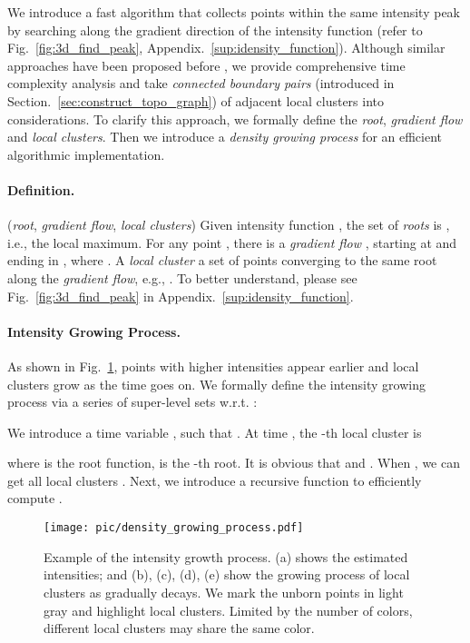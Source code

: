 \documentclass[letterpaper]{article} \usepackage{aaai22}  \usepackage{times}  \usepackage{helvet}  \usepackage{courier}  \usepackage[hyphens]{url}  \usepackage{graphicx} \urlstyle{rm} \def\UrlFont{\rm}  \usepackage{natbib}  \usepackage{caption} \DeclareCaptionStyle{ruled}{labelfont=normalfont,labelsep=colon,strut=off} \frenchspacing  \setlength{\pdfpagewidth}{8.5in}  \setlength{\pdfpageheight}{11in}  \usepackage{subfigure}
\begin{document}
We introduce a fast algorithm that collects points within the same intensity peak by searching along the gradient direction of the intensity function (refer to Fig.~\ref{fig:3d_find_peak}, Appendix.~\ref{sup:idensity_function}). Although similar approaches have been proposed before \cite{chazal2013persistence, rodriguez2014clustering}, we provide comprehensive time complexity analysis and take \textit{connected boundary pairs} (introduced in Section.~\ref{sec:construct_topo_graph}) of adjacent local clusters into considerations. To clarify this approach, we formally define the \textit{root}, \textit{gradient flow} and \textit{local clusters}. Then we introduce a \textit{density growing process} for an efficient algorithmic implementation.




\paragraph{Definition.} (\textit{root}, \textit{gradient flow}, \textit{local clusters})
 Given intensity function , the set of \textit{roots} is , i.e., the local maximum. 
 For any point , there is a \textit{gradient flow} , starting at  and ending in  , where . A \textit{local cluster} a set of points converging to the same root along the \textit{gradient flow}, e.g., . To better understand, please see Fig.~\ref{fig:3d_find_peak} in Appendix.~\ref{sup:idensity_function}.\\


\paragraph{Intensity Growing Process.} As shown in Fig.~\ref{fig:density_growing_process}, points with higher intensities appear earlier and local clusters grow as the time goes on. We formally define the intensity growing process via a series of super-level sets w.r.t. :

We introduce a time variable , such that . At time , the -th local cluster is 

where  is the root function,  is the -th root. It is obvious that  and . When , we can get all local clusters . Next, we introduce a recursive function to efficiently compute .



\begin{figure}[h]
    \centering
    \texttt{[image: pic/density\_growing\_process.pdf]}
    \caption{ Example of the intensity growth process. (a) shows the estimated intensities; and (b), (c), (d), (e) show the growing process of local clusters as  gradually decays. We mark the unborn points in light gray and highlight local clusters. Limited by the number of colors, different local clusters may share the same color. }
    \label{fig:density_growing_process}
\end{figure}
\end{document}
